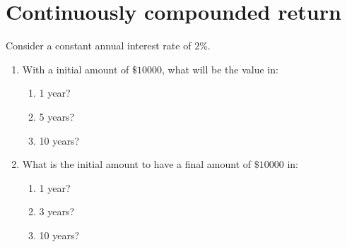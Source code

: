 \section{Continuously compounded return}

Consider a constant annual interest rate of $2\%$. 

\begin{enumerate}
    \item With a initial amount of $\$10000 $, what will be the value in:
    \begin{enumerate}
        \item 1 year?
        \item 5 years?
        \item 10 years?
    \end{enumerate}
    \item What is the initial amount to have a final amount of $\$10000$ in:
    \begin{enumerate}
        \item 1 year?
        \item 3 years?
        \item 10 years?
    \end{enumerate}
\end{enumerate}



